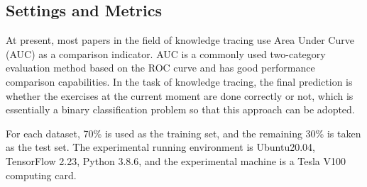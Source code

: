 \subsection{Settings and Metrics}
At present, most papers in the field of knowledge tracing use Area Under Curve (AUC) as a comparison indicator. AUC is a commonly used two-category evaluation method based on the ROC curve and has good performance comparison capabilities. In the task of knowledge tracing, the final prediction is whether the exercises at the current moment are done correctly or not, which is essentially a binary classification problem so that this approach can be adopted.

For each dataset, 70\% is used as the training set, and the remaining 30\% is taken as the test set. The experimental running environment is Ubuntu20.04, TensorFlow 2.23, Python 3.8.6, and the experimental machine is a Tesla V100 computing card.

